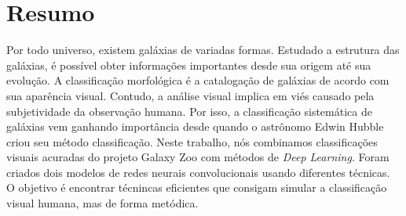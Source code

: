 \section*{Resumo}
 
Por todo universo, existem galáxias de variadas formas. Estudado a estrutura das galáxias, é possível obter informações importantes desde  sua origem até sua evolução. A classificação morfológica é a catalogação de galáxias de acordo com sua aparência visual. Contudo, a análise visual implica em viés causado pela subjetividade da observação humana. Por isso, a classificação sistemática de galáxias vem ganhando importância desde quando o astrônomo Edwin Hubble criou seu método classificação. Neste trabalho, nós combinamos classificações visuais acuradas do projeto Galaxy Zoo com métodos de \emph{Deep Learning}. Foram criados dois modelos de redes neurais convolucionais usando diferentes técnicas. O objetivo é encontrar técnincas eficientes que consigam simular a classificação visual humana, mas de forma metódica.